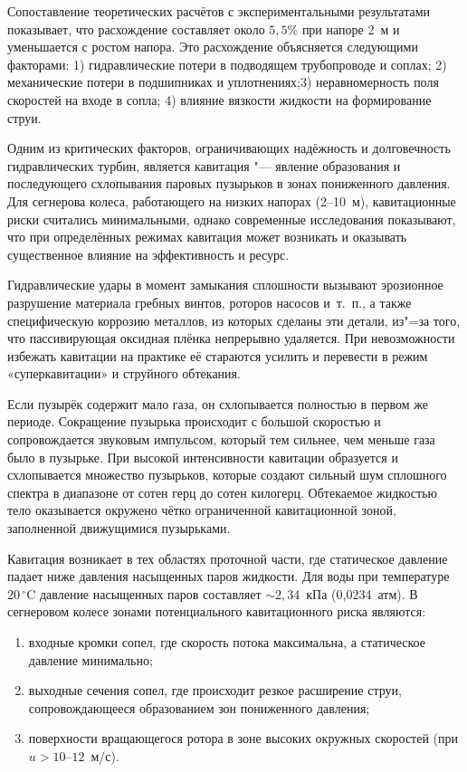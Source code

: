 Сопоставление теоретических расчётов с экспериментальными результатами \cite{bozarov2024a}
показывает, что расхождение составляет около $5{,}5\%$ при напоре 2~м и уменьшается 
с ростом напора. Это расхождение объясняется следующими факторами: 1) гидравлические потери в 
подводящем трубопроводе и соплах; 2) механические потери в подшипниках и уплотнениях;3) неравномерность 
поля скоростей на входе в сопла; 4) влияние вязкости жидкости на формирование струи. 

Одним из критических факторов, ограничивающих надёжность и долговечность
гидравлических турбин, является кавитация "--- явление образования и последующего
схлопывания паровых пузырьков в зонах пониженного давления. Для сегнерова колеса,
работающего на низких напорах (2--10~м), кавитационные риски считались минимальными,
однако современные исследования \cite{bozarov2024b} показывают, что при определённых режимах
кавитация может возникать и оказывать существенное влияние на эффективность и ресурс.

Гидравлические удары в момент замыкания сплошности вызывают эрозионное разрушение 
материала гребных винтов, роторов насосов и~т.~п., а также специфическую коррозию 
металлов, из которых сделаны эти детали, из"=за того, что пассивирующая оксидная плёнка 
непрерывно удаляется. При невозможности избежать кавитации на практике её стараются 
усилить и перевести в режим «суперкавитации» и струйного обтекания.

Если пузырёк содержит мало газа, он схлопывается полностью в первом же периоде. 
Сокращение пузырька происходит с большой скоростью и сопровождается звуковым импульсом, 
который тем сильнее, чем меньше газа было в пузырьке. При высокой интенсивности 
кавитации образуется и схлопывается множество пузырьков, которые создают сильный шум 
сплошного спектра в диапазоне от сотен герц до сотен килогерц. Обтекаемое жидкостью 
тело оказывается окружено чётко ограниченной кавитационной зоной, заполненной 
движущимися пузырьками.

Кавитация возникает в тех областях проточной части, где статическое давление
падает ниже давления насыщенных паров жидкости. Для воды при температуре 
$20\,^{\circ}\text{C}$ давление насыщенных паров составляет $\sim 2{,}34$~кПа (0,0234~атм). 
В сегнеровом колесе зонами потенциального кавитационного риска являются:

\begin{enumerate}
    \renewcommand{\labelenumi}{\arabic{enumi})}
    \item входные кромки сопел, где скорость потока максимальна, а статическое давление минимально;
    \item выходные сечения сопел, где происходит резкое расширение струи, сопровождающееся образованием зон пониженного давления;
    \item поверхности вращающегося ротора в зоне высоких окружных скоростей (при $u > 10$--$12$~м/с).
\end{enumerate}

